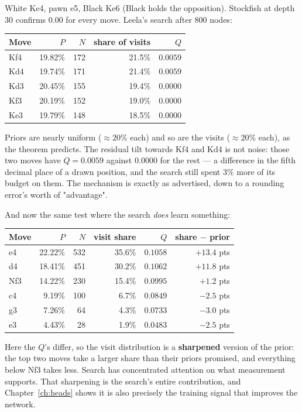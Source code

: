 \begin{realdata}[title={Real engine output: 800 nodes on a position where all moves draw}]
White Ke4, pawn e5, Black Ke6 (Black holds the opposition). Stockfish at depth 30 confirms
$0.00$ for every move. Leela's search after 800 nodes:
\begin{center}
\begin{tabular}{@{}lrrrr@{}}
\toprule
Move & $P$ & $N$ & share of visits & $Q$ \\
\midrule
Kf4 & 19.82\% & 172 & 21.5\% & $0.0059$ \\
Kd4 & 19.74\% & 171 & 21.4\% & $0.0059$ \\
Kd3 & 20.45\% & 155 & 19.4\% & $0.0000$ \\
Kf3 & 20.19\% & 152 & 19.0\% & $0.0000$ \\
Ke3 & 19.79\% & 148 & 18.5\% & $0.0000$ \\
\bottomrule
\end{tabular}
\end{center}
Priors are nearly uniform ($\approx 20\%$ each) and so are the visits ($\approx 20\%$ each),
as the theorem predicts. The residual tilt towards Kf4 and Kd4 is not noise: those two moves
have $Q = 0.0059$ against $0.0000$ for the rest --- a difference in the fifth decimal place of
a drawn position, and the search still spent $3\%$ more of its budget on them. The mechanism
is exactly as advertised, down to a rounding error's worth of "advantage".
\end{realdata}

And now the same test where the search \emph{does} learn something:

\begin{realdata}[title={Real engine output: 1600 nodes on the initial position}]
\begin{center}
\begin{tabular}{@{}lrrrrr@{}}
\toprule
Move & $P$ & $N$ & visit share & $Q$ & share $-$ prior \\
\midrule
e4  & 22.22\% & 532 & 35.6\% & $0.1058$ & $+13.4$ pts \\
d4  & 18.41\% & 451 & 30.2\% & $0.1062$ & $+11.8$ pts \\
Nf3 & 14.22\% & 230 & 15.4\% & $0.0995$ & $+1.2$ pts \\
c4  &  9.19\% & 100 &  6.7\% & $0.0849$ & $-2.5$ pts \\
g3  &  7.26\% &  64 &  4.3\% & $0.0733$ & $-3.0$ pts \\
e3  &  4.43\% &  28 &  1.9\% & $0.0483$ & $-2.5$ pts \\
\bottomrule
\end{tabular}
\end{center}
Here the $Q$'s differ, so the visit distribution is a \textbf{sharpened} version of the
prior: the top two moves take a larger share than their priors promised, and everything below
Nf3 takes less. Search has concentrated attention on what measurement supports. That
sharpening is the search's entire contribution, and Chapter~\ref{ch:heads} shows it is also
precisely the training signal that improves the network.
\end{realdata}

